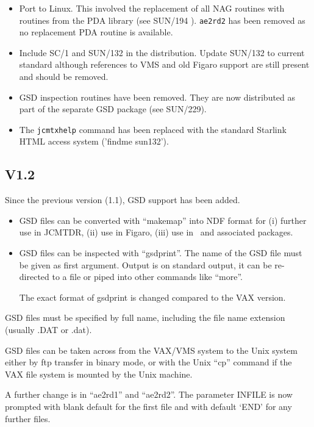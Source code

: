 \documentclass[twoside,11pt]{article}
\newcommand{\xref}[3]{#1}
\renewcommand{\_}{\texttt{\symbol{95}}}
\newcommand{\Kappa}{\xref{{\sc{Kappa}}}{sun95}{}}
\begin{document}
\begin{itemize}
\item Port to Linux. This involved the replacement of all NAG routines with
  routines from the PDA library (see \xref{SUN/194}{sun194}{} \cite{pda}). \texttt{ae2rd2} has been removed
  as no replacement PDA routine is available.
\item Include SC/1 and SUN/132 in the distribution. Update SUN/132 to current
  standard although references to VMS and old Figaro support are still present
and should be removed.
\item GSD inspection routines have been removed. They are now distributed as
  part of the separate GSD package (see SUN/229).
\item The \texttt{jcmt\_xhelp} command has been replaced with the standard
  Starlink HTML access system ('findme sun132').

\end{itemize}

\subsection*{V1.2}

Since the previous version (1.1), GSD support has been added.
\begin{itemize}
\item GSD files can be converted with ``makemap'' into NDF format for (i)
    further use in JCMTDR, (ii) use in Figaro, (iii) use in \Kappa\ and
    associated packages.

\item GSD files can be inspected with ``gsd\_print''. The name of the GSD
    file must be given as first argument. Output is on standard output,
    it can be re-directed to a file or piped into other commands like
    ``more''.

    The exact format of gsd\_print is changed compared to the VAX
    version.
\end{itemize}

 GSD files must be specified by full name, including the file name
 extension (usually .DAT or .dat).

 GSD files can be taken across from the VAX/VMS system to the Unix
 system either by ftp transfer in binary mode, or with the Unix ``cp''
 command if the VAX file system is mounted by the Unix machine.

 A further change is in ``ae2rd1'' and ``ae2rd2''. The parameter INFILE is
 now prompted with blank default for the first file and with default
 `END' for any further files.
\end{document}
